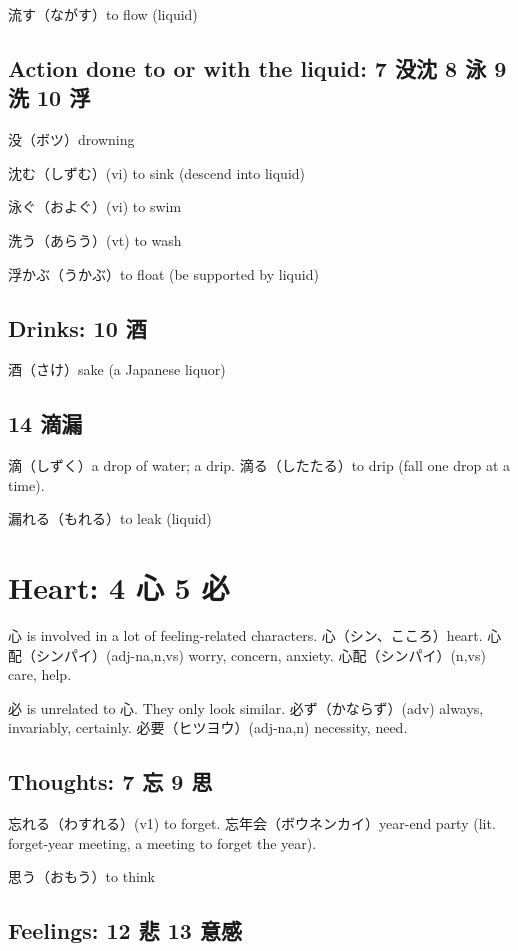 流す（ながす）to flow (liquid)

\subsection{Action done to or with the liquid: 7 没沈 8 泳 9 洗 10 浮}

没（ボツ）drowning

沈む（しずむ）(vi) to sink (descend into liquid)

泳ぐ（およぐ）(vi) to swim

洗う（あらう）(vt) to wash

浮かぶ（うかぶ）to float (be supported by liquid)

\subsection{Drinks: 10 酒}

酒（さけ）sake (a Japanese liquor)

\subsection{14 滴漏}

滴（しずく）a drop of water; a drip.
滴る（したたる）to drip (fall one drop at a time).

漏れる（もれる）to leak (liquid)

\section{Heart: 4 心 5 必}

心 is involved in a lot of feeling-related characters.
心（シン、こころ）heart.
心配（シンパイ）(adj-na,n,vs) worry, concern, anxiety.
心配（シンパイ）(n,vs) care, help.

必 is unrelated to 心. They only look similar.
必ず（かならず）(adv) always, invariably, certainly.
必要（ヒツヨウ）(adj-na,n) necessity, need.

\subsection{Thoughts: 7 忘 9 思}

忘れる（わすれる）(v1) to forget.
忘年会（ボウネンカイ）year-end party
(lit. forget-year meeting, a meeting to forget the year).

思う（おもう）to think

\subsection{Feelings: 12 悲 13 意感}

